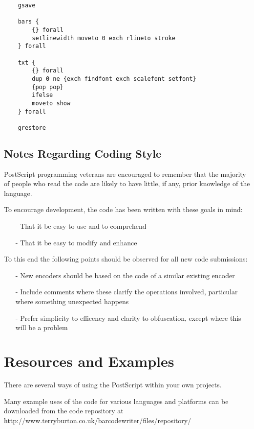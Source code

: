 \documentclass []{article}
\begin{document}
\begin{verbatim}
    gsave
    
    bars {
        {} forall
        setlinewidth moveto 0 exch rlineto stroke
    } forall
    
    txt {
        {} forall
        dup 0 ne {exch findfont exch scalefont setfont} 
        {pop pop} 
        ifelse
        moveto show
    } forall

    grestore
\end{verbatim}

\subsection{Notes Regarding Coding Style}

PostScript programming veterans are encouraged to remember that the
majority of people who read the code are likely to have little,
if any, prior knowledge of the language.

To encourage development, the code has been written with these
goals in mind:

\begin{itemize}
\item[-]{That it be easy to use and to comprehend}
\item[-]{That it be easy to modify and enhance}
\end{itemize}

To this end the following points should be observed for all new
code submissions:

\begin{itemize}
\item[-]{New encoders should be based on the code of a similar
existing encoder}
\item[-]{Include comments where these clarify the operations 
involved, particular where something unexpected happens}
\item[-]{Prefer simplicity to efficency and clarity to
obfuscation, except where this will be a problem}
\end{itemize}

\newpage

\section{Resources and Examples}

There are several ways of using the PostScript within your own
projects.

Many example uses of the code for various languages and platforms
can be downloaded from the code repository at \mbox{http://www.terryburton.co.uk/barcodewriter/files/repository/}
\end{document}
